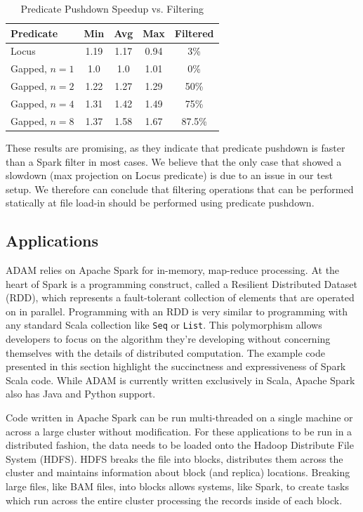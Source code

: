\documentclass[10pt,twocolumn]{article}
\theoremstyle{plain}
\begin{document}
\begin{table}[h]
\caption{Predicate Pushdown Speedup vs. Filtering}
\label{tab:filter-vs-predicate}
\begin{center}
\begin{tabular}{| l | c  c c | c |}
\hline
\bf Predicate & \bf Min & \bf Avg & \bf Max & \bf Filtered \\
\hline
Locus & 1.19 & 1.17 & 0.94 & 3\% \\
Gapped, $n = 1$ & 1.0 & 1.0 & 1.01 & 0\% \\
Gapped, $n = 2$ & 1.22 & 1.27 & 1.29 & 50\% \\
Gapped, $n = 4$ & 1.31 & 1.42 & 1.49 & 75\% \\
Gapped, $n = 8$ & 1.37 & 1.58 & 1.67 & 87.5\% \\
\hline
\end{tabular}
\end{center}
\end{table}

These results are promising, as they indicate that predicate pushdown is faster than a Spark filter in most cases. We believe that the
only case that showed a slowdown (max projection on Locus predicate) is due to an issue in our test setup. We therefore can conclude
that filtering operations that can be performed statically at file load-in should be performed using predicate pushdown.

\subsection{Applications}
\label{sec:applications}

ADAM relies on Apache Spark for in-memory, map-reduce processing. At the heart of Spark is a programming construct,
called a Resilient Distributed Dataset (RDD), which represents a fault-tolerant collection of elements that are
operated on in parallel. Programming with an RDD is very similar to programming with any standard Scala collection
like \texttt{Seq} or \texttt{List}. This polymorphism allows developers to focus on the algorithm they're developing 
without concerning themselves with the details of distributed computation. The example code presented in this section
highlight the succinctness and expressiveness of Spark Scala code. While ADAM is currently written exclusively in 
Scala, Apache Spark also has Java and Python support.

Code written in Apache Spark can be run multi-threaded on a single machine or across a large cluster without modification.
For these applications to be run in a distributed fashion, the data needs to be loaded onto the Hadoop
Distribute File System (HDFS). HDFS breaks the file into blocks, distributes them across the cluster and maintains
information about block (and replica) locations. Breaking large files, like BAM files, into blocks allows systems,
like Spark, to create tasks which run across the entire cluster processing the records inside of each block. 
\end{document}
